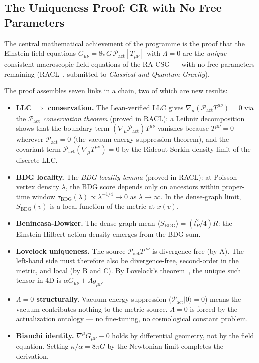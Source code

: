 \documentclass[11pt,a4paper]{article}
\newcommand{\SBDG}{S_{\mathrm{BDG}}}
\newcommand{\Pact}{\mathcal{P}_{\mathrm{act}}}
\begin{document}
\subsection{The Uniqueness Proof: GR with No Free Parameters}

The central mathematical achievement of the programme is the proof that
the Einstein field equations $G_{\mu\nu} = 8\pi G\,\Pact[T_{\mu\nu}]$
with $\Lambda = 0$ are the \emph{unique} consistent macroscopic field
equations of the RA-CSG --- with no free parameters remaining
(RACL~\citep{Sandeman2026RACL}, submitted to \emph{Classical and Quantum
Gravity}).

The proof assembles seven links in a chain, two of which are new results:

\begin{itemize}[noitemsep]
  \item[\textbf{(A)}] \textbf{LLC $\Rightarrow$ conservation.}
  The Lean-verified LLC gives $\nabla_\mu(\Pact T^{\mu\nu}) = 0$
  via the \emph{$\Pact$ conservation theorem} (proved in RACL):
  a Leibniz decomposition shows that the boundary term
  $(\nabla_\mu\Pact)T^{\mu\nu}$ vanishes because $T^{\mu\nu} = 0$
  wherever $\Pact = 0$ (the vacuum energy suppression theorem),
  and the covariant term $\Pact(\nabla_\mu T^{\mu\nu}) = 0$ by
  the Rideout-Sorkin density limit of the discrete LLC.

  \item[\textbf{(B)}] \textbf{BDG locality.}
  The \emph{BDG locality lemma} (proved in RACL): at Poisson vertex
  density $\lambda$, the BDG score depends only on ancestors within
  proper-time window $\tau_{\mathrm{BDG}}(\lambda) \propto \lambda^{-1/4}
  \to 0$ as $\lambda \to \infty$. In the dense-graph limit, $\SBDG(v)$
  is a local function of the metric at $x(v)$.

  \item[\textbf{(C)}] \textbf{Benincasa-Dowker.}
  The dense-graph mean $\langle\SBDG\rangle = (l_P^2/4)R$: the
  Einstein-Hilbert action density emerges from the BDG sum.

  \item[\textbf{(D--E)}] \textbf{Lovelock uniqueness.}
  The source $\Pact T^{\mu\nu}$ is divergence-free (by A). The
  left-hand side must therefore also be divergence-free, second-order
  in the metric, and local (by B and C). By Lovelock's
  theorem~\citep{Lovelock1971}, the unique such tensor in 4D is
  $\alpha G_{\mu\nu} + \Lambda g_{\mu\nu}$.

  \item[\textbf{(F)}] \textbf{$\Lambda = 0$ structurally.}
  Vacuum energy suppression ($\Pact|0\rangle = 0$) means the vacuum
  contributes nothing to the metric source. $\Lambda = 0$ is forced by
  the actualization ontology --- no fine-tuning, no cosmological constant
  problem.

  \item[\textbf{(G)}] \textbf{Bianchi identity.}
  $\nabla^\mu G_{\mu\nu} \equiv 0$ holds by differential geometry,
  not by the field equation. Setting $\kappa/\alpha = 8\pi G$ by
  the Newtonian limit completes the derivation.
\end{itemize}
\end{document}

